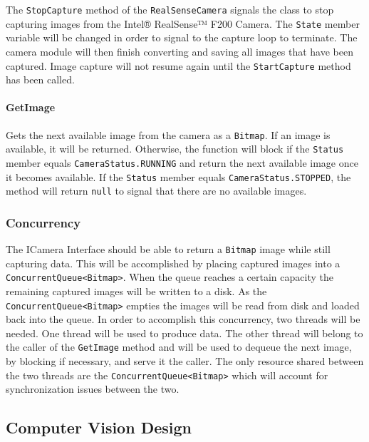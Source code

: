 \documentclass[12pt]{article}
\begin{document}
The \texttt{StopCapture} method of the \texttt{RealSenseCamera} signals
the class to stop capturing images from the Intel® RealSense™ F200
Camera. The \texttt{State} member variable will be changed in order to
signal to the capture loop to terminate. The camera module will then
finish converting and saving all images that have been captured. Image
capture will not resume again until the \texttt{StartCapture} method has
been called.

\paragraph{GetImage}\label{getimage}

Gets the next available image from the camera as a \texttt{Bitmap}. If
an image is available, it will be returned. Otherwise, the function will
block if the \texttt{Status} member equals \texttt{CameraStatus.RUNNING}
and return the next available image once it becomes available. If the
\texttt{Status} member equals \texttt{CameraStatus.STOPPED}, the method
will return \texttt{null} to signal that there are no available images.

\subsubsection{Concurrency}\label{concurrency}

The ICamera Interface should be able to return a \texttt{Bitmap} image
while still capturing data. This will be accomplished by placing
captured images into a
\texttt{ConcurrentQueue\textless{}Bitmap\textgreater{}}. When the queue
reaches a certain capacity the remaining captured images will be written
to a disk. As the
\texttt{ConcurrentQueue\textless{}Bitmap\textgreater{}} empties the
images will be read from disk and loaded back into the queue. In order
to accomplish this concurrency, two threads will be needed. One thread
will be used to produce data. The other thread will belong to the caller
of the \texttt{GetImage} method and will be used to dequeue the next
image, by blocking if necessary, and serve it the caller. The only
resource shared between the two threads are the
\texttt{ConcurrentQueue\textless{}Bitmap\textgreater{}} which will
account for synchronization issues between the two.

\subsection{Computer Vision Design}\label{computer-vision-design}
\end{document}
